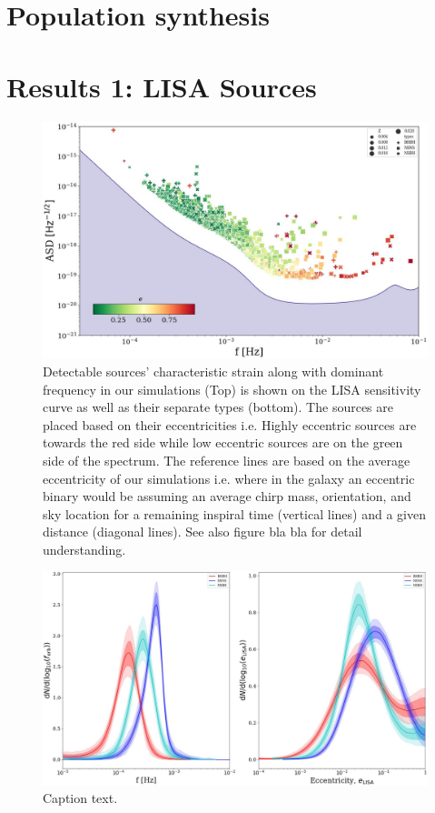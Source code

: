\documentclass[12pt, journal, onecolumn]{IEEEtran}
\begin{document}
    \section{Population synthesis}
    \label{sec:population_synthesis}
    


    \section{Results 1: LISA Sources}
    \label{sec:r}
    \begin{subfigures}
        \begin{figure}[!t]
            \centering
            \includegraphics[width=0.82\linewidth]{images/first}
            \caption{\label{first}Detectable sources' characteristic strain along with dominant frequency in our simulations (Top) is shown on the LISA sensitivity curve as well as their separate types (bottom). The sources are placed based on their eccentricities i.e. Highly eccentric sources are towards the red side while low eccentric sources are on the green side of the spectrum. The reference lines are based on the average eccentricity of our simulations i.e. where in the galaxy an eccentric binary would be assuming an average chirp mass, orientation, and sky location for a remaining inspiral time (vertical lines) and a given distance (diagonal lines). See also figure bla bla for detail understanding.}\label{detect} %
        \end{figure}
        \begin{figure}
            \includegraphics[width=\linewidth]{images/second}
            \caption{Caption text.}\label{fig:freq} %
        \end{figure}
    \end{subfigures}
\end{document}
